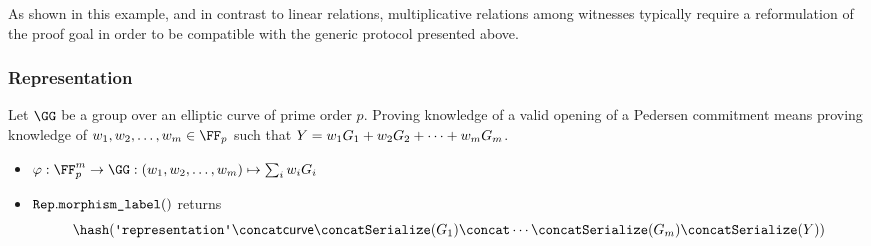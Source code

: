 \documentclass[11pt]{article}
\begin{document}
As shown in this example, and in contrast to linear relations, multiplicative relations among witnesses typically require a reformulation of the proof goal in order to be compatible with the generic protocol presented above.


\subsubsection{Representation}\label{sec:instantiations:representation}
Let $\GG$ be a group over an elliptic curve of prime order $p$.
Proving knowledge of a valid opening of a Pedersen commitment means proving knowledge of $\witness_1,\witness_2, \dots, \witness_m\in\FF_p$ such that $Y=w_1G_1 + w_2G_2 + \dots + w_m G_m$.


\begin{itemize}
  \item $\varphi:\FF_p^m\to\GG:(\witness_1,\witness_2, \dots, \witness_m)\mapsto \sum_i \witness_iG_i$
  \item $\texttt{Rep}.\texttt{morphism\_label}()$ returns
  \[
    \hash(\replabel \concat \curvectx \concat \serialize(G_1) \concat \cdots \concat \serialize(G_m) \concat \serialize(\statement))
  \]
\end{itemize}
\end{document}
